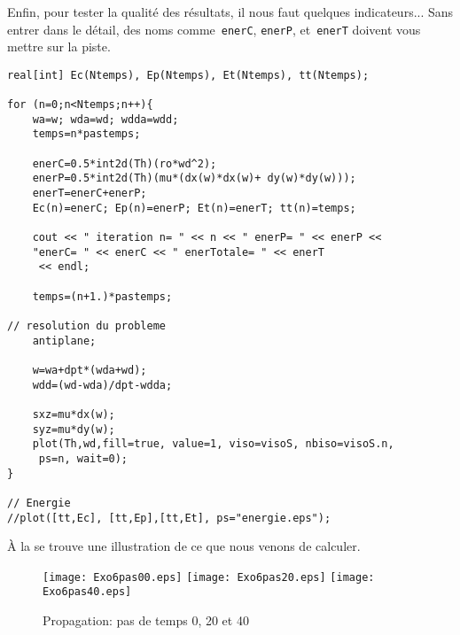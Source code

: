 Enfin, pour tester la qualité des résultats, il nous faut quelques indicateurs... Sans entrer dans le détail, des noms comme~\verb|enerC|, \verb|enerP|, et~\verb|enerT| doivent vous mettre sur la piste.
\begin{lstlisting}[firstnumber=last]
real[int] Ec(Ntemps), Ep(Ntemps), Et(Ntemps), tt(Ntemps); 

for (n=0;n<Ntemps;n++){	
	wa=w; wda=wd; wdda=wdd; 	
	temps=n*pastemps; 

	enerC=0.5*int2d(Th)(ro*wd^2);
	enerP=0.5*int2d(Th)(mu*(dx(w)*dx(w)+ dy(w)*dy(w)));
	enerT=enerC+enerP;
	Ec(n)=enerC; Ep(n)=enerP; Et(n)=enerT; tt(n)=temps; 
		
	cout << " iteration n= " << n << " enerP= " << enerP << 
    "enerC= " << enerC << " enerTotale= " << enerT 
     << endl;
	
	temps=(n+1.)*pastemps; 

// resolution du probleme 
	antiplane;
	
	w=wa+dpt*(wda+wd);
	wdd=(wd-wda)/dpt-wdda; 

	sxz=mu*dx(w);
	syz=mu*dy(w); 
	plot(Th,wd,fill=true, value=1, viso=visoS, nbiso=visoS.n, 
     ps=n, wait=0); 	
}

// Energie 
//plot([tt,Ec], [tt,Ep],[tt,Et], ps="energie.eps"); 
\end{lstlisting}

À la  se trouve une illustration de ce que nous venons de calculer.
\begin{figure}[h!]
  \center
  \texttt{[image: Exo6pas00.eps]} \hfill
  \texttt{[image: Exo6pas20.eps]} \hfill
  \texttt{[image: Exo6pas40.eps]}
  \caption{\label{Fig-Exo6} Propagation: pas de temps 0, 20 et 40}
\end{figure}

